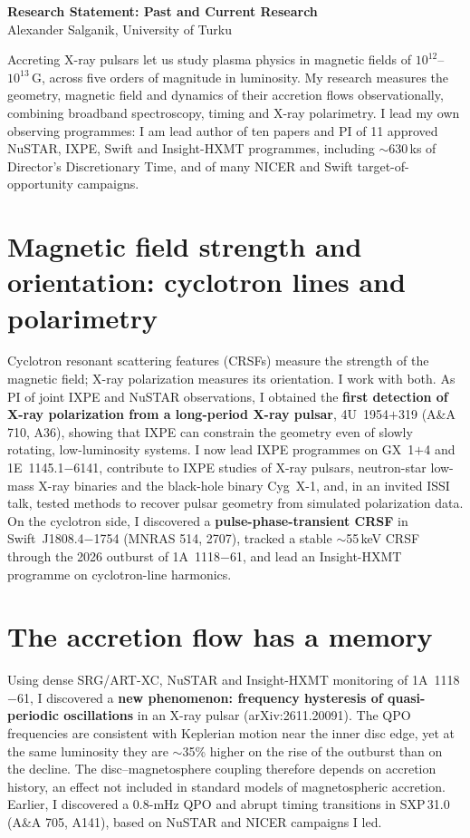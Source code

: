 \documentclass[11pt]{article}
\begin{document}
\begin{center}
{\large\bfseries\color{Accent} Research Statement: Past and Current Research}\\[2pt]
Alexander Salganik, University of Turku
\end{center}

Accreting X-ray pulsars let us study plasma physics in magnetic fields of
$10^{12}$--$10^{13}$\,G, across five orders of magnitude in luminosity. My research
measures the geometry, magnetic field and dynamics of their accretion flows
observationally, combining broadband spectroscopy, timing and X-ray polarimetry. I lead
my own observing programmes: I am lead author of ten papers and PI of 11 approved
NuSTAR, IXPE, Swift and Insight-HXMT programmes, including $\sim$630\,ks of Director's
Discretionary Time, and of many NICER and Swift target-of-opportunity campaigns.

\section*{Magnetic field strength and orientation: cyclotron lines and polarimetry}
Cyclotron resonant scattering features (CRSFs) measure the strength of the magnetic
field; X-ray polarization measures its orientation. I work with both. As PI of joint
IXPE and NuSTAR observations, I obtained the \textbf{first detection of X-ray
polarization from a long-period X-ray pulsar}, 4U~1954$+$319 (A\&A 710, A36), showing
that IXPE can constrain the geometry even of slowly rotating, low-luminosity systems. I
now lead IXPE programmes on GX~1$+$4 and 1E~1145.1$-$6141, contribute to IXPE studies of
X-ray pulsars, neutron-star low-mass X-ray binaries and the black-hole binary Cyg~X-1,
and, in an invited ISSI talk, tested methods to recover pulsar geometry from simulated
polarization data. On the cyclotron side, I discovered a \textbf{pulse-phase-transient
CRSF} in Swift~J1808.4$-$1754 (MNRAS 514, 2707), tracked a stable $\sim$55\,keV CRSF
through the 2026 outburst of 1A~1118$-$61, and lead an Insight-HXMT programme on
cyclotron-line harmonics.

\section*{The accretion flow has a memory}
Using dense SRG/ART-XC, NuSTAR and Insight-HXMT monitoring of 1A~1118$-$61, I discovered
a \textbf{new phenomenon: frequency hysteresis of quasi-periodic oscillations} in an
X-ray pulsar (arXiv:2611.20091). The QPO frequencies are consistent with Keplerian
motion near the inner disc edge, yet at the same luminosity they are $\sim$35\% higher on
the rise of the outburst than on the decline. The disc--magnetosphere coupling therefore
depends on accretion history, an effect not included in standard models of
magnetospheric accretion. Earlier, I discovered a 0.8-mHz QPO and abrupt timing
transitions in SXP\,31.0 (A\&A 705, A141), based on NuSTAR and NICER campaigns I led.
\end{document}
